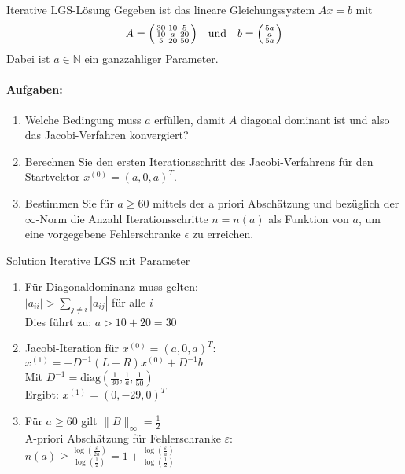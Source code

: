 \begin{example2}{Iterative LGS-Lösung}
Gegeben ist das lineare Gleichungssystem $Ax = b$ mit
$$A = \begin{psmallmatrix}
30 & 10 & 5\\
10 & a & 20\\
5 & 20 & 50
\end{psmallmatrix}
\quad \text{und} \quad
b = \begin{psmallmatrix}
5a\\
a\\
5a
\end{psmallmatrix}$$
Dabei ist $a \in \mathbb{N}$ ein ganzzahliger Parameter.

\paragraph{Aufgaben:}
\begin{enumerate}
    \item Welche Bedingung muss $a$ erfüllen, damit $A$ diagonal dominant ist und also das Jacobi-Verfahren konvergiert?
    
    \item Berechnen Sie den ersten Iterationsschritt des Jacobi-Verfahrens für den Startvektor $x^{(0)} = (a,0,a)^T$.
    
    \item Bestimmen Sie für $a \geq 60$ mittels der a priori Abschätzung und bezüglich der $\infty$-Norm die Anzahl Iterationsschritte $n = n(a)$ als Funktion von $a$, um eine vorgegebene Fehlerschranke $\epsilon$ zu erreichen.
\end{enumerate}
\end{example2}

\begin{KR}{Solution Iterative LGS mit Parameter}
\begin{enumerate}
    \item Für Diagonaldominanz muss gelten:\\
    $|a_{ii}| > \sum_{j\neq i} |a_{ij}|$ für alle $i$\\
    Dies führt zu: $a > 10 + 20 = 30$
    
    \item Jacobi-Iteration für $x^{(0)} = (a,0,a)^T$:\\
    $x^{(1)} = -D^{-1}(L+R)x^{(0)} + D^{-1}b$\\
    Mit $D^{-1} = \text{diag}(\frac{1}{30}, \frac{1}{a}, \frac{1}{50})$\\
    Ergibt: $x^{(1)} = (0,-29,0)^T$
    
    \item Für $a \geq 60$ gilt $\|B\|_\infty = \frac{1}{2}$\\
    A-priori Abschätzung für Fehlerschranke $\varepsilon$:\\
    $n(a) \geq \frac{\log(\frac{\varepsilon}{2a})}{\log(\frac{1}{2})} = 1 + \frac{\log(\frac{\varepsilon}{a})}{\log(\frac{1}{2})}$
\end{enumerate}
\end{KR}


